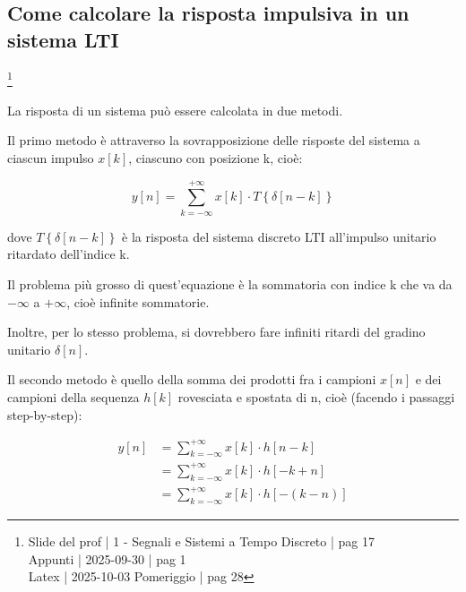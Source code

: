 \newpage 

\subsection{Come calcolare la risposta impulsiva in un sistema LTI}

\footnote{ 
    Slide del prof | 1 - Segnali e Sistemi a Tempo Discreto | pag 17\\
    Appunti | 2025-09-30 | pag 1 \\ 
    Latex | 2025-10-03 Pomeriggio | pag 28
}

La risposta di un sistema può essere calcolata in due metodi. \newline 

Il primo metodo è attraverso la sovrapposizione delle risposte del sistema a ciascun impulso $x \left[ k\right]$, 
ciascuno con posizione k, cioè: 

{
    \Large 
    \begin{equation}
        y \left[ n\right]
        = 
        \sum_{k = - \infty}^{+ \infty}
        x \left[ k\right]
        \cdot 
        T \left\{ \delta \left[ n - k\right]\right\}
    \end{equation}
}

dove $T \left\{ \delta \left[ n - k\right]\right\}$ è la risposta del sistema discreto LTI all'impulso unitario ritardato dell'indice k. \newline 

\begin{tcolorbox}
    Il problema più grosso di quest'equazione è la sommatoria con indice k che va da $- \infty$ a $+ \infty$, 
    cioè infinite sommatorie. \newline 

    Inoltre, per lo stesso problema, si dovrebbero fare infiniti ritardi del gradino unitario $\delta \left[ n\right]$. 
\end{tcolorbox}

Il secondo metodo è quello della somma dei prodotti fra i campioni $x \left[ n\right]$ e dei campioni della sequenza $h \left[ k\right]$ rovesciata e spostata di n, cioè (facendo i passaggi step-by-step): 

{
    \Large 
    \begin{equation}
        \begin{split}
        y \left[ n\right]
        &= 
        \sum_{k = - \infty}^{+ \infty}
        x \left[ k\right]
        \cdot 
        h \left[ n - k\right]
        \\
        &= 
        \sum_{k = - \infty}^{+ \infty}
        x \left[ k\right]
        \cdot 
        h \left[ - k + n\right]
        \\
        &=
        \sum_{k = - \infty}^{+ \infty}
        x \left[ k\right]
        \cdot 
        h \left[ - \left( k - n\right)\right]
        \end{split}
    \end{equation}
}

